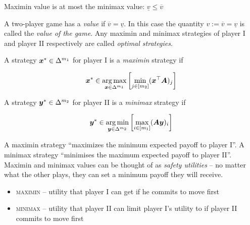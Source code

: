 \begin{fact}
	Maximin value is at most the minimax value: $\underline{v} \le
	\overline{v}$
\end{fact}

\begin{definition}
	A two-player game has a \emph{value} if $\overline{v}=\underline{v}$. In
	this case the quantity $v:=\overline{v}=\underline{v}$ is called the
	\emph{value of the game}. Any maximin and minimax strategies of player I
	and player II respectively are called \emph{optimal strategies}.
\end{definition}

\begin{definition}[Maximin]
	A strategy $\bm{x}^* \in \Delta^{m_1}$ for player I is a \textit{maximin}
	strategy if

	\begin{equation}
		\bm{x}^* \in \operatorname*{arg\,max}_{\bm{x} \in \Delta^{m_1}} \left[
			\min_{j \in [m_2]} (\bm{x}^\top \bm{A})_j \right]
	\end{equation}
\end{definition}

\begin{definition}[Minimax]
	A strategy $\bm{y}^* \in \Delta^{m_2}$ for player II is a
	\textit{minimax} strategy if

	\begin{equation}
		\bm{y}^* \in \operatorname*{arg\,min}_{\bm{y} \in \Delta^{m_2}} \left[
			\max_{i \in [m_1]} (\bm{A} \bm{y})_i \right]
	\end{equation}
\end{definition}

A maximin strategy ``maximizes the minimum expected payoff to player I''. A
minimax strategy ``minimises the maximum expected payoff to player II''.
Maximin and minimax values can be thought of as \textit{safety utilities} -- no
matter what the other plays, they can set a minimum payoff they will receive.

\begin{itemize}
	\item \textsc{maximin} -- utility that player I can get if he commits to
		move first
	\item \textsc{minimax} -- utility that player II can limit player I's
		utility to if player II commits to move first
\end{itemize}

